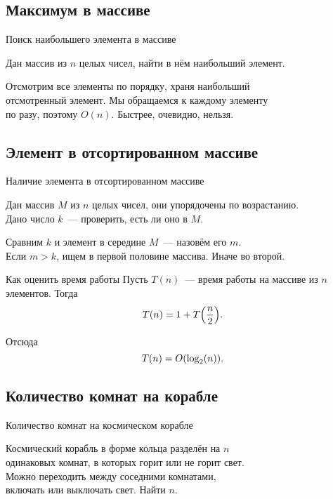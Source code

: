 \documentclass[12pt,aspectratio=169,svgnames]{beamer}
\begin{document}
\subsection{Максимум в массиве}

\begin{frame}{Поиск наибольшего элемента в массиве} \ \\
\begin{task}
	Дан массив из \(n\) целых чисел, найти в нём наибольший элемент.
\end{task}

Отсмотрим все элементы по порядку, храня наибольший \\
отсмотренный элемент. Мы обращаемся к каждому элементу \\
по разу, поэтому \(O(n)\). Быстрее, очевидно, нельзя.
	
\end{frame}

\subsection{Элемент в отсортированном массиве}

\begin{frame}{Наличие элемента в отсортированном массиве} \ \\
\begin{task}
	Дан массив \(M\) из \(n\) целых чисел, они упорядочены по возрастанию. \\
	Дано число \(k\)~— проверить, есть ли оно в \(M\).
\end{task}

Сравним \(k\) и элемент в середине \(M\)~— назовём его \(m\). \\
Если \(m>k\), ищем в первой половине массива. Иначе во второй.
	
\end{frame}

\begin{frame}{Как оценить время работы}
	Пусть \(T(n)\)~— время работы на массиве из \(n\) элементов. Тогда
	\[ T(n) = 1 + T\lr*{\frac{n}{2}}.\]

	Отсюда \[ T(n) = O\lr*{\log_2 \lr*{n}}.\]
\end{frame}

\subsection{Количество комнат на корабле}

\begin{frame}{Количество комнат на космическом корабле} \ \\
\begin{task}
	Космический корабль в форме кольца разделён на \(n\) \\
	одинаковых комнат, в которых горит или не горит свет. \\
	Можно переходить между соседними комнатами, \\
	включать или выключать свет. Найти \(n\).
\end{task} \medskip

\begin{center}  \end{center}
\end{frame}
\end{document}

